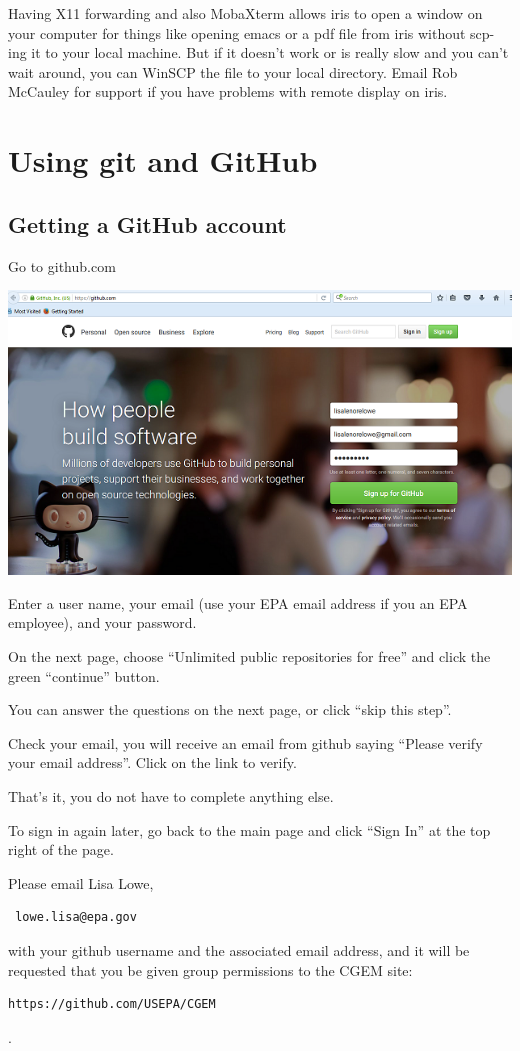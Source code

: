 \documentclass[12pt,letterpaper]{memoir} %
\begin{document}
Having X11 forwarding and also MobaXterm allows iris to open a window on your computer for things like opening emacs or a pdf file from iris without scp-ing it to your local machine.  But if it doesn’t work or is really slow and you can’t wait around, you can WinSCP the file to your local directory.  Email Rob McCauley for support if you have problems with remote display on iris.

\chapter{Using git and GitHub}

\section{Getting a GitHub account}

Go to github.com

\begin{center}
\includegraphics{Figures/App2/Git/GitHub_login.png}
\end{center}

Enter a user name, your email (use your EPA email address if you an EPA employee), and your password.

On the next page, choose “Unlimited public repositories for free” and click the green “continue” button.

You can answer the questions on the next page, or click “skip this step”.

Check your email, you will receive an email from github saying “Please verify your email address”. Click on the link to verify.

That’s it, you do not have to complete anything else.

To sign in again later, go back to the main page and click “Sign In” at the top right of the page.

Please email Lisa Lowe, 
\begin{verbatim} lowe.lisa@epa.gov\end{verbatim} 
with your github username and the associated email address, and it will be requested that you be given group permissions to the CGEM site: \begin{verbatim}https://github.com/USEPA/CGEM \end{verbatim}.
\end{document}
